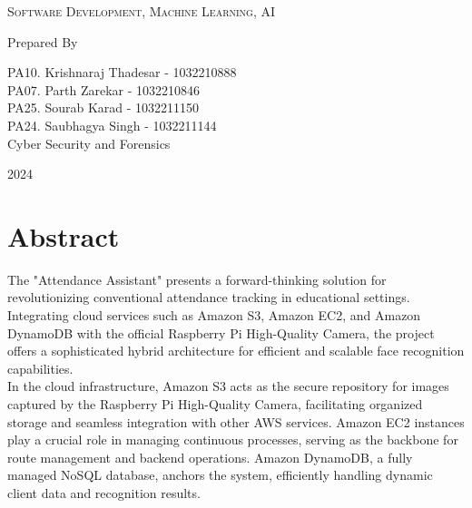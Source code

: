 \documentclass[11pt]{article}
\begin{document}
\begin{titlepage}

    \LARGE\textsc{
        Software Development, Machine Learning, AI\\
    } %
    \vfill


    Prepared By
    \vspace{0.5\baselineskip} %

    \Large{
        PA10. Krishnaraj Thadesar - 1032210888\\
        PA07. Parth Zarekar - 1032210846\\
        PA25. Sourab Karad - 1032211150\\
        PA24. Saubhagya Singh - 1032211144\\
        Cyber Security and Forensics\\
    }


    \vspace{0.5\baselineskip} %
    2024

\end{titlepage}


\tableofcontents
\thispagestyle{empty}
\clearpage

\setcounter{page}{1}

\section{Abstract}
The "Attendance Assistant" presents a forward-thinking solution for revolutionizing conventional attendance tracking in educational settings. Integrating cloud services such as Amazon S3, Amazon EC2, and Amazon DynamoDB with the official Raspberry Pi High-Quality Camera, the project offers a sophisticated hybrid architecture for efficient and scalable face recognition capabilities.\\

In the cloud infrastructure, Amazon S3 acts as the secure repository for images captured by the Raspberry Pi High-Quality Camera, facilitating organized storage and seamless integration with other AWS services. Amazon EC2 instances play a crucial role in managing continuous processes, serving as the backbone for route management and backend operations. Amazon DynamoDB, a fully managed NoSQL database, anchors the system, efficiently handling dynamic client data and recognition results.\\
\end{document}
